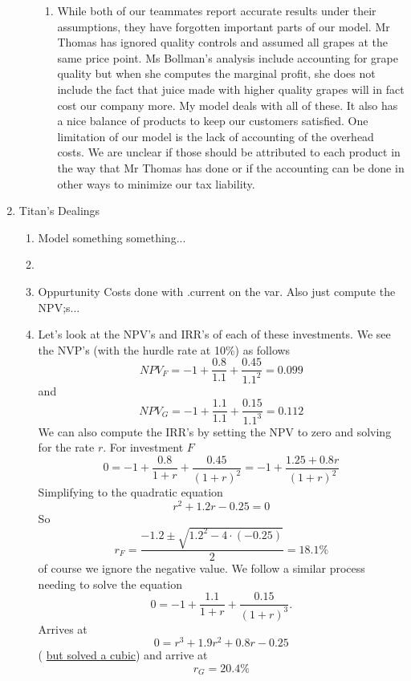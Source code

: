 \documentclass[11pt]{article}
\begin{document}
\begin{enumerate}
\begin{enumerate}
\begin{enumerate}
\item While both of our teammates report accurate results under their assumptions, they have forgotten important parts of our model.  Mr Thomas has ignored quality controls and assumed all grapes at the same price point.  Ms Bollman's analysis include accounting for grape quality but when she computes the marginal profit, she does not include the fact that juice made with higher quality grapes will in fact cost our company more.  My model deals with all of these.  It also has a nice balance of products to keep our customers satisfied.  One limitation of our model is the lack of accounting of the overhead costs.  We are unclear if those should be attributed to each product in the way that Mr Thomas has done or if the accounting can be done in other ways to minimize our tax liability.
\end{enumerate}
\end{enumerate}
\item Titan's Dealings
\begin{enumerate}
\item Model something something...
\item 
\item Oppurtunity Costs done with .current on the var.  Also just compute the NPV;s...
\item Let's look at the NPV's and IRR's of each of these investments.  We see the NVP's (with the hurdle rate at 10\%) as follows
\[
NPV_F = -1+\frac{0.8}{1.1} +\frac{0.45}{1.1^2} = 0.099
\]
and
\[
NPV_G = -1 +\frac{1.1}{1.1} +\frac{0.15}{1.1^3} = 0.112
\]
We can also compute the IRR's by setting the NPV to zero and solving for the rate $r$.  For investment $F$
\[
0 = -1 +\frac{0.8}{1+r} +\frac{0.45}{(1+r)^2} = -1 +\frac{1.25+0.8r}{(1+r)^2}
\]
Simplifying to the quadratic equation
\[
r^2+1.2r-0.25 = 0
\]
So 
\[
r_F = \frac{-1.2\pm\sqrt{1.2^2-4\cdot(-0.25)}}{2} = 18.1\%
\]
of course we ignore the negative value.  We follow a similar process needing to solve the equation
\[
0 = -1 +\frac{1.1}{1+r} +\frac{0.15}{(1+r)^3}.
\]
Arrives at 
\[
0 =r^3+1.9r^2+0.8r-0.25
\]
( \href{https://www.calculatorsoup.com/calculators/algebra/cubicequation.php?a=1\&b=1.9\&c=.8\&d=-.25\&action=solve}{but solved a cubic}) and arrive at
\[
r_G = 20.4\%
\]

\end{enumerate}
\end{enumerate}
\end{document}
